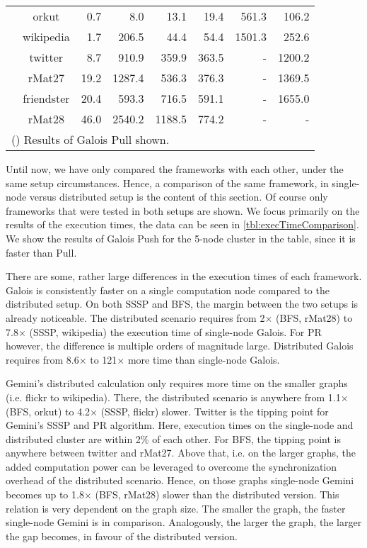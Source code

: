\begin{table}
\begin{tabular}{ccr@{\tabskip 1 \tabcolsep}r
	r@{\tabskip 1 \tabcolsep}r
	r@{\tabskip 1 \tabcolsep}r}
		& orkut & 0.7\txtdagger & 8.0 & 13.1 & 19.4 & 561.3 & 106.2 \\
		& wikipedia & 1.7\txtdagger & 206.5 & 44.4 & 54.4 & 1501.3 & 252.6 \\
		& twitter & 8.7\txtdagger & 910.9 & 359.9 & 363.5 & - & 1200.2 \\
		& rMat27 & 19.2\txtdagger & 1287.4 & 536.3 & 376.3 & - & 1369.5 \\
		& friendster & 20.4\txtdagger & 593.3 & 716.5 & 591.1 & - & 1655.0 \\
		& rMat28 & 46.0\txtdagger & 2540.2 & 1188.5 & 774.2 & - & - \\
		\bottomrule
		\multicolumn{8}{l}{(\txtdagger) Results of Galois Pull shown.}
	\end{tabular}
\end{table}
Until now, we have only compared the frameworks with each other, under the same setup circumstances. Hence, a comparison of the same framework, in single-node versus distributed setup is the content of this section.
Of course only frameworks that were tested in both setups are shown.
We focus primarily on the results of the execution times, the data can be seen in \autoref{tbl:execTimeComparison}. We show the results of Galois Push for the 5-node cluster in the table, since it is faster than Pull.

There are some, rather large differences in the execution times of each framework. Galois is consistently faster on a single computation node compared to the distributed setup. 
On both SSSP and BFS, the margin between the two setups is already noticeable. The distributed scenario requires from 2$\times$ (BFS, rMat28) to 7.8$\times$ (SSSP, wikipedia) the execution time of single-node Galois.
For PR however, the difference is multiple orders of magnitude large. Distributed Galois requires from 8.6$\times$ to 121$\times$ more time than single-node Galois. 

Gemini's distributed calculation only requires more time on the smaller graphs (i.e. flickr to wikipedia). There, the distributed scenario is anywhere from 1.1$\times$ (BFS, orkut) to 4.2$\times$ (SSSP, flickr) slower.
Twitter is the tipping point for Gemini's SSSP and PR algorithm. Here, execution times on the single-node and distributed cluster are within 2\% of each other. For BFS, the tipping point is anywhere between twitter and rMat27.
Above that, i.e. on the larger graphs, the added computation power can be leveraged to overcome the synchronization overhead of the distributed scenario. Hence, on those graphs single-node Gemini becomes up to 1.8$\times$ (BFS, rMat28) slower than the distributed version.
This relation is very dependent on the graph size. The smaller the graph, the faster single-node Gemini is in comparison. Analogously, the larger the graph, the larger the gap becomes, in favour of the distributed version.

